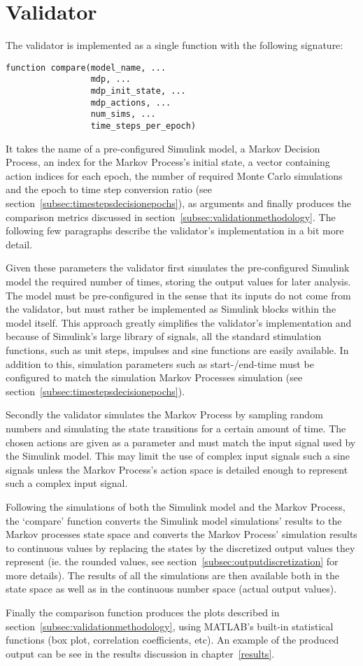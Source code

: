 \section{Validator}

The validator is implemented as a single function with the following signature:

\begin{verbatim}
function compare(model_name, ...
                 mdp, ...
                 mdp_init_state, ...
                 mdp_actions, ...
                 num_sims, ...
                 time_steps_per_epoch)
\end{verbatim}



 It takes the name of a pre-configured Simulink model, a Markov Decision Process, an index for the Markov Process's initial state, a vector containing action indices for each epoch, the number of required Monte Carlo simulations and the epoch to time step conversion ratio (see section~\ref{subsec:timestepsdecisionepochs}), as arguments and finally produces the comparison metrics discussed in section~\ref{subsec:validationmethodology}. The following few paragraphs describe the validator's implementation in a bit more detail.

Given these parameters the validator first simulates the pre-configured Simulink model the required number of times, storing the output values for later analysis. The model must be pre-configured in the sense that its inputs do not come from the validator, but must rather be implemented as Simulink blocks within the model itself. This approach greatly simplifies the validator's implementation and because of Simulink's large library of signals, all the standard stimulation functions, such as unit steps, impulses and sine functions are easily available. In addition to this, simulation parameters such as start-/end-time must be configured to match the simulation Markov Processes simulation (see section~\ref{subsec:timestepsdecisionepochs}).

Secondly the validator simulates the Markov Process by sampling random numbers and simulating the state transitions for a certain amount of time. The chosen actions are given as a parameter and must match the input signal used by the Simulink model. This may limit the use of complex input signals such a sine signals unless the Markov Process's action space is detailed enough to represent such a complex input signal.

Following the simulations of both the Simulink model and the Markov Process, the `compare' function converts the Simulink model simulations' results to the Markov processes state space and converts the Markov Process' simulation results to continuous values by replacing the states by the discretized output values they represent (ie. the rounded values, see section~\ref{subsec:outputdiscretization} for more details). The results of all the simulations are then available both in the state space as well as in the continuous number space (actual output values).

Finally the comparison function produces the plots described in section~\ref{subsec:validationmethodology}, using MATLAB's built-in statistical functions (box plot, correlation coefficients, etc). An example of the produced output can be see in the results discussion in chapter~\ref{results}.
